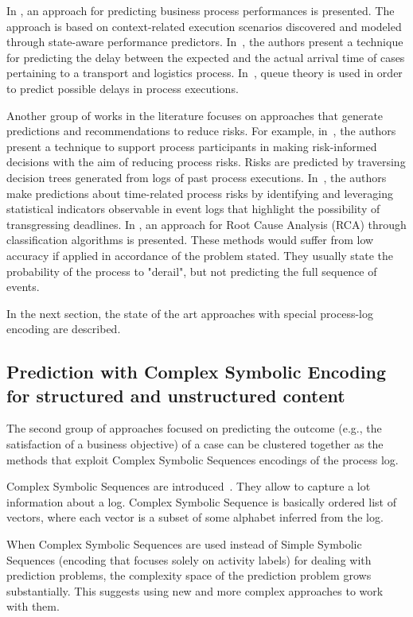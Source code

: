 In \cite{Folino}, an approach for predicting business process performances is presented. The approach is based on context-related execution scenarios discovered and modeled through state-aware performance predictors. In~\cite{Metzgeretal12}, the authors present a technique for predicting the delay between the expected and the actual arrival time of cases pertaining to a transport and logistics process. In~\cite{Senderovichetal15}, queue theory is used in order to predict possible delays in process executions.

Another group of works in the literature focuses on approaches that generate predictions and recommendations to reduce risks. For example, in~\cite{DBLP:conf/caise/ConfortiLRA13}, the authors present a technique to support process participants in making risk-informed decisions with the aim of reducing process risks. Risks are predicted by traversing decision trees generated from logs of past process executions. In~\cite{Pika}, the authors make predictions about time-related process risks by identifying and leveraging statistical indicators observable in event logs that highlight the possibility of transgressing deadlines.
In \cite{suriadi}, an approach for Root Cause Analysis (RCA) through classification algorithms is presented. These methods would suffer from low accuracy if applied in accordance of the problem stated. They usually state the probability of the process to "derail", but not predicting the full sequence of events. 


In the next section, the state of the art approaches with special process-log encoding are described.



\subsection{Prediction with Complex Symbolic Encoding for structured and unstructured content}

The second group of approaches focused on predicting the outcome (e.g., the satisfaction of a business objective) of a case can be clustered together as the methods that exploit Complex Symbolic Sequences encodings of the process log.

Complex Symbolic Sequences are introduced~\cite{Leontjeva2015}. They allow to capture a lot information about a log. Complex Symbolic Sequence is basically ordered list of vectors, where each vector is a subset of some alphabet inferred from the log.

When Complex Symbolic Sequences are used instead of Simple Symbolic Sequences (encoding that focuses solely on activity labels) for dealing with prediction problems, the complexity space of the prediction problem grows substantially. This suggests using new and more complex approaches to work with them.

